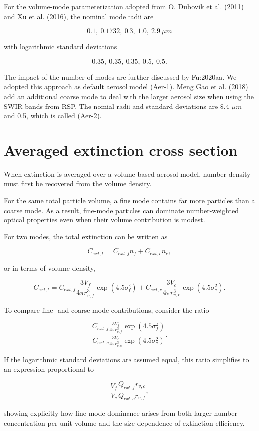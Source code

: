 \documentclass[
  letterpaper,
  open=any]{scrbook}
\begin{document}
For the volume-mode parameterization adopted from O. Dubovik et al.
(2011) and Xu et al. (2016), the nominal mode radii are

\[
0.1,\ 0.1732,\ 0.3,\ 1.0,\ 2.9 \ \mu m
\]

with logarithmic standard deviations

\[
0.35,\ 0.35,\ 0.35,\ 0.5,\ 0.5.
\]

The impact of the number of modes are further discussed by Fu:2020aa. We
adopted this approach as default aerosol model (Aer-1). Meng Gao et al.
(2018) add an additional coarse mode to deal with the larger aerosol
size when using the SWIR bands from RSP. The nomial radii and standard
deviations are 8.4 \(\mu m\) and 0.5, which is called (Aer-2).

\section{Averaged extinction cross
section}\label{averaged-extinction-cross-section}

When extinction is averaged over a volume-based aerosol model, number
density must first be recovered from the volume density.

For the same total particle volume, a fine mode contains far more
particles than a coarse mode. As a result, fine-mode particles can
dominate number-weighted optical properties even when their volume
contribution is modest.

For two modes, the total extinction can be written as

\[
C_{ext,t}=C_{ext,f} n_f+C_{ext,c} n_c,
\]

or in terms of volume density,

\[
C_{ext,t}= C_{ext,f} \frac{3 V_f}{4\pi r^3_{v,f}}\exp(4.5 \sigma^2_f)+
C_{ext,c} \frac{3 V_c}{4\pi r^3_{v,c}}\exp(4.5 \sigma^2_c).
\]

To compare fine- and coarse-mode contributions, consider the ratio

\[
\frac{C_{ext,f} \frac{3 V_f}{4\pi r^3_{v,f}}\exp(4.5 \sigma^2_f)}
{C_{ext,c} \frac{3 V_c}{4\pi r^3_{v,c}}\exp(4.5 \sigma^2_c)}.
\]

If the logarithmic standard deviations are assumed equal, this ratio
simplifies to an expression proportional to

\[
\frac{V_f}{V_c}\frac{Q_{ext,f} r_{v,c}}{Q_{ext,c} r_{v,f}},
\]

showing explicitly how fine-mode dominance arises from both larger
number concentration per unit volume and the size dependence of
extinction efficiency.
\end{document}
